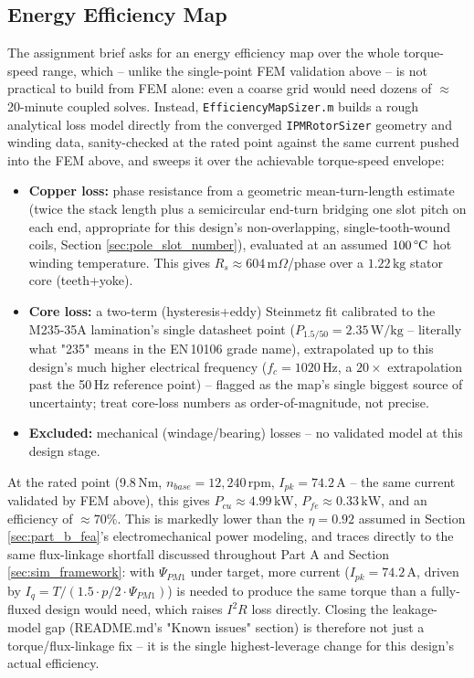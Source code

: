 \documentclass[11pt,a4paper]{article}
\begin{document}
\subsection{Energy Efficiency Map}
\label{sec:efficiency_map}
The assignment brief asks for an energy efficiency map over the whole torque-speed range, which -- unlike the single-point FEM validation above -- is not practical to build from FEM alone: even a coarse grid would need dozens of $\approx$20-minute coupled solves. Instead, \texttt{EfficiencyMapSizer.m} builds a rough analytical loss model directly from the converged \texttt{IPMRotorSizer} geometry and winding data, sanity-checked at the rated point against the same current pushed into the FEM above, and sweeps it over the achievable torque-speed envelope:
\begin{itemize}
    \item \textbf{Copper loss:} phase resistance from a geometric mean-turn-length estimate (twice the stack length plus a semicircular end-turn bridging one slot pitch on each end, appropriate for this design's non-overlapping, single-tooth-wound coils, Section \ref{sec:pole_slot_number}), evaluated at an assumed $100\,\text{\textdegree{}C}$ hot winding temperature. This gives $R_s\approx604\,\text{m}\Omega$/phase over a $1.22\,\text{kg}$ stator core (teeth+yoke).
    \item \textbf{Core loss:} a two-term (hysteresis+eddy) Steinmetz fit calibrated to the M235-35A lamination's single datasheet point ($P_{1.5/50}=2.35\,\text{W/kg}$ -- literally what "235" means in the EN\,10106 grade name), extrapolated up to this design's much higher electrical frequency ($f_c=1020\,\text{Hz}$, a $20\times$ extrapolation past the 50\,Hz reference point) -- flagged as the map's single biggest source of uncertainty; treat core-loss numbers as order-of-magnitude, not precise.
    \item \textbf{Excluded:} mechanical (windage/bearing) losses -- no validated model at this design stage.
\end{itemize}
At the rated point (9.8\,Nm, $n_{base}=12{,}240$\,rpm, $I_{pk}=74.2$\,A -- the same current validated by FEM above), this gives $P_{cu}\approx4.99\,\text{kW}$, $P_{fe}\approx0.33\,\text{kW}$, and an efficiency of $\approx70\%$. This is markedly lower than the $\eta=0.92$ assumed in Section \ref{sec:part_b_fea}'s electromechanical power modeling, and traces directly to the same flux-linkage shortfall discussed throughout Part A and Section \ref{sec:sim_framework}: with $\Psi_{PM1}$ under target, more current ($I_{pk}=74.2\,\text{A}$, driven by $I_q=T/(1.5\cdot p/2\cdot\Psi_{PM1})$) is needed to produce the same torque than a fully-fluxed design would need, which raises $I^2R$ loss directly. Closing the leakage-model gap (README.md's "Known issues" section) is therefore not just a torque/flux-linkage fix -- it is the single highest-leverage change for this design's actual efficiency.
\end{document}
